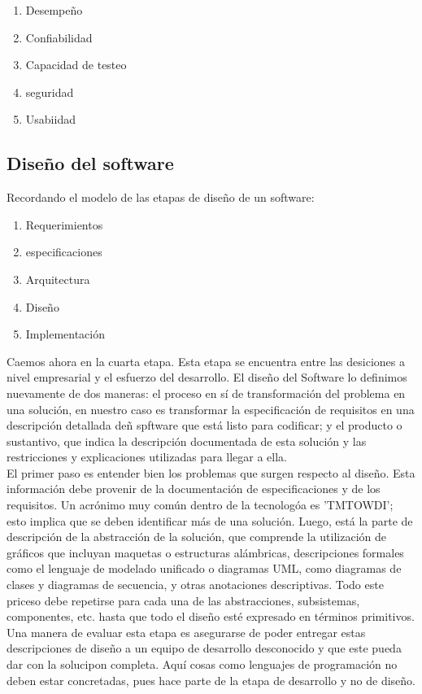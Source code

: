 \begin{enumerate}
    \item Desempeño
    \item Confiabilidad
    \item Capacidad de testeo
    \item seguridad
    \item Usabiidad
\end{enumerate}

\subsection{Diseño del software}
Recordando el modelo de las etapas de diseño de un software:

\begin{enumerate}
    \item Requerimientos
    \item especificaciones
    \item Arquitectura
    \item Diseño
    \item Implementación
\end{enumerate}

Caemos ahora en la cuarta etapa. Esta etapa se encuentra entre las desiciones a nivel empresarial y el esfuerzo del desarrollo. El diseño del Software lo definimos nuevamente de dos maneras: el proceso en sí de transformación del problema en una solución, en nuestro caso es transformar la especificación de requisitos en una descripción detallada deñ spftware que está listo para codificar; y el producto o sustantivo, que indica la descripción documentada de esta solución y las restricciones y explicaciones utilizadas para llegar a ella. \\
El primer paso es entender bien los problemas que surgen respecto al diseño. Esta información debe provenir de la documentación de especificaciones y de los requisitos. Un acrónimo muy común dentro de la tecnologóa es 'TMTOWDI'; esto implica que se deben identificar más de una solución. Luego, está la parte de descripción de la abstracción de la solución, que comprende la utilización de gráficos que incluyan maquetas o estructuras alámbricas, descripciones formales como el lenguaje de modelado unificado o diagramas UML, como diagramas de clases y diagramas de secuencia, y otras anotaciones descriptivas. Todo este priceso debe repetirse para cada una de las abstracciones, subsistemas, componentes, etc. hasta que todo el diseño esté expresado en términos primitivos. Una manera de evaluar esta etapa es asegurarse de poder entregar estas descripciones de diseño a un equipo de desarrollo desconocido y que este pueda dar con la solucipon completa. Aquí cosas como lenguajes de programación no deben estar concretadas, pues hace parte de la etapa de desarrollo y no de diseño. \\

